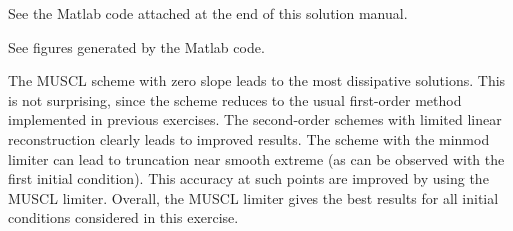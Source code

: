 \documentclass{article}
\begin{document}





\begin{exerciseList}


\item
See the Matlab code attached at the end of this solution manual.


\item
See figures generated by the Matlab code.

The MUSCL scheme with zero slope leads to the most dissipative solutions. This is not surprising, since the scheme reduces to the usual first-order method implemented in previous exercises. The second-order schemes with limited linear reconstruction clearly leads to improved results. The scheme with the minmod limiter can lead to truncation near smooth extreme (as can be observed with the first initial condition). This accuracy at such points are improved by using the MUSCL limiter. Overall, the MUSCL limiter gives the best results for all initial conditions considered in this exercise.


\end{exerciseList}









\end{document}
